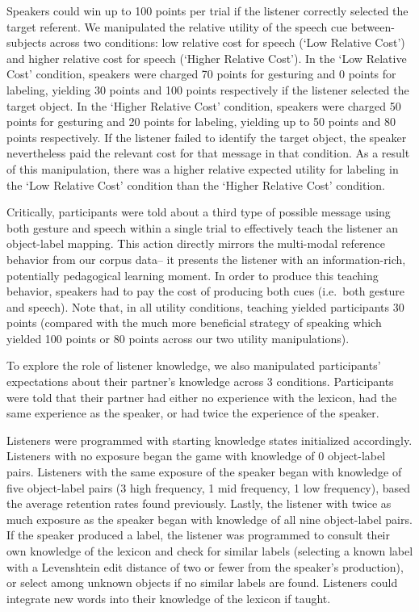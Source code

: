 \documentclass[10pt, letterpaper]{article}
\begin{document}
Speakers could win up to 100 points per trial if the listener correctly
selected the target referent. We manipulated the relative utility of the
speech cue between-subjects across two conditions: low relative cost for
speech (`Low Relative Cost') and higher relative cost for speech
(`Higher Relative Cost'). In the `Low Relative Cost' condition, speakers
were charged 70 points for gesturing and 0 points for labeling, yielding
30 points and 100 points respectively if the listener selected the
target object. In the `Higher Relative Cost' condition, speakers were
charged 50 points for gesturing and 20 points for labeling, yielding up
to 50 points and 80 points respectively. If the listener failed to
identify the target object, the speaker nevertheless paid the relevant
cost for that message in that condition. As a result of this
manipulation, there was a higher relative expected utility for labeling
in the `Low Relative Cost' condition than the `Higher Relative Cost'
condition.

Critically, participants were told about a third type of possible
message using both gesture and speech within a single trial to
effectively teach the listener an object-label mapping. This action
directly mirrors the multi-modal reference behavior from our corpus
data-- it presents the listener with an information-rich, potentially
pedagogical learning moment. In order to produce this teaching behavior,
speakers had to pay the cost of producing both cues (i.e.~both gesture
and speech). Note that, in all utility conditions, teaching yielded
participants 30 points (compared with the much more beneficial strategy
of speaking which yielded 100 points or 80 points across our two utility
manipulations).

To explore the role of listener knowledge, we also manipulated
participants' expectations about their partner's knowledge across 3
conditions. Participants were told that their partner had either no
experience with the lexicon, had the same experience as the speaker, or
had twice the experience of the speaker.

Listeners were programmed with starting knowledge states initialized
accordingly. Listeners with no exposure began the game with knowledge of
0 object-label pairs. Listeners with the same exposure of the speaker
began with knowledge of five object-label pairs (3 high frequency, 1 mid
frequency, 1 low frequency), based the average retention rates found
previously. Lastly, the listener with twice as much exposure as the
speaker began with knowledge of all nine object-label pairs. If the
speaker produced a label, the listener was programmed to consult their
own knowledge of the lexicon and check for similar labels (selecting a
known label with a Levenshtein edit distance of two or fewer from the
speaker's production), or select among unknown objects if no similar
labels are found. Listeners could integrate new words into their
knowledge of the lexicon if taught.
\end{document}
